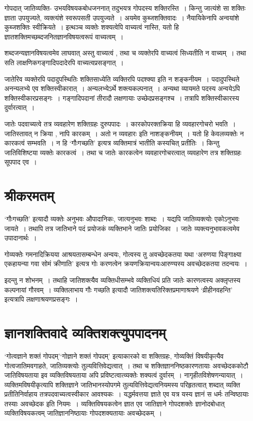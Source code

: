{गोपदात् जातिव्यक्ति- उभयविषयकबोधजननात् तदुभयत्र गोपदस्य शक्तिरस्ति~। किन्तु जात्यंशे सा शक्तिः ज्ञाता उपयुज्यते, व्यक्त्यंशे स्वरूपसती उपयुज्यते~। अयमेव कुब्जशक्तिवादः~। नैयायिकेनापि अन्वयांशे कुब्जशक्तिः स्वीक्रियते~। इत्थञ्च व्यक्तेः शक्यत्वेपि वाच्यत्वं नास्ति, यतो हि ज्ञातशक्तिमच्छब्दजनितज्ञानविषयत्वरूपं वाच्यत्वम्~। 

शब्दजन्यज्ञानविषयत्वमेव लाघवात् अस्तु वाच्यत्वं , तथा च व्यक्तेरपि वाच्यत्वं       सिध्यतीति न वाच्यम्~। तथा सति लाक्षणिकगङ्गादिपदादेरपि वाच्यत्वप्रसङ्गात्~। 

जातेरिव व्यक्तेरपि पदादुपस्थितिः शक्तिसाध्येति व्यक्तिरपि पदश्क्या इति न शङ्कनीयम~। पदादुपस्थिते अनन्यलभ्ये एव शक्तिस्वीकारात्~। अन्यलभ्येऽर्थे शक्त्यकल्पनात्~। अन्यथा व्यायमते पदस्य अन्वयेऽपि शक्तिस्वीकारप्रसङ्गः~। गङ्गादिपदानां तीरादौ लक्षणायाः उच्छेदप्रसङ्गश्च~। तत्रापि शक्तिस्वीकारस्य दुर्वारत्वात्~। 

जातेः पदवाच्यत्वे तत्र व्यवहारेण  शक्तिग्रहः दुरुपपादः~। कारकोपरक्तक्रिया हि व्यवहारगोचरो भवति~। जातिस्तावत् न क्रिया , नापि कारकम्~। अतो न व्यवहारः इति नाशङ्कनीयम्~। यतो हि केवलव्यक्तेः न कारकत्वं सम्भवति~। न हि ‘गौःगच्छति’ इत्यत्र व्यक्तिमात्रं भातीति कस्यचित् प्रतीतिः~। किन्तु जातिविशिष्टया व्यक्तेः कारकत्वं~। तथा च जातेः कारकत्वेन व्यवहारगोचरत्वात् व्यवहारेण तत्र शक्तिग्रहः सूपपाद एव~। 

\section*{श्रीकरमतम्}

‘गौःगच्छति’ इत्यादौ व्यक्तेः अनुभवः औपादानिकः, जात्यनुभवः शाब्दः~। यद्यपि जातिव्यक्त्योः एकोऽनुभवः जायते~। तथापि तत्र जातिभाने पदं प्रयोजकं व्यक्तिभाने जातिः प्रयोजिका~। जातेः व्यक्त्यनुभावकत्वमेव उपादानार्थः~। 
\newpage

गोव्यक्तेः गमनादिक्रियया आश्रयतासम्बन्धेन अन्वयः, गोत्वस्य तु अवच्छेदकतया यथा ‘अरुणया पिङ्गाक्ष्या एकहायन्या गवा सोमं क्रीणाति’ इत्यत्र गोः करणत्वेन क्रयणक्रियान्वयःआरुण्यस्य अवच्छेदकतया तदन्वयः~। 

इदन्तु न शोभनम्~। तथाहि जातिशक्त्यैव व्यक्तिधीसम्भवे व्यक्तिधियं प्रति जातेः कारणत्वस्य अक्लृप्तस्य कल्पनायां गौरवम्~। व्यक्तिलाभाय गौः गच्छति इत्यादौ जातिशक्त्यतिरिक्तप्रमाणाश्रयणे ‘व्रीहीनवहन्ति’ इत्यत्रापि लक्षणाश्रयणप्रसङ्गः~। 

\section*{ज्ञानशक्तिवादे व्यक्तिशक्त्युपपादनम्}

‘गोत्वज्ञाने शक्तं गोपदम्’‘गोज्ञाने शक्तं गोपदम्’ इत्याकारको वा शक्तिग्रहः, गोव्यक्तिं विषयीकृत्यैव गोत्वजातिमवगाहते, जातिव्यक्त्योः      तुल्यवित्तिवेद्यत्वात्~। तथा च शक्तिज्ञाननिष्ठकारणतायाः अवच्छेदककोटौ जातिविषयताया इव व्यक्तिविषयताया अपि प्रविष्टत्वात्\break व्यक्तेः शक्यत्वं दुर्वारम्~। नागृहीतविशेषणन्यायात्~। व्यक्तिमविषयीकृत्यापि शक्तिज्ञाने जाति\-भानस्योपगमे तुल्यवित्तिवेद्यत्वनियमस्य परिहृतत्वात् शब्दात् व्यक्ति प्रतीतिनिर्वाहाय तत्र\break पदवाच्यत्वस्वीकार आवश्यकः~। यद्धर्मवत्तया ज्ञाते एव यत्र यस्य ज्ञानं    स धर्मः तन्वि\-ष्ठायाः तस्याः अवच्छेदक इति नियमः~। व्यक्तिविषयकत्वेन ज्ञात एव जातिज्ञाने गोपदशक्तेः ज्ञानोद\-बोधात् व्यक्तिविषयकत्वम् जातिज्ञाननिष्ठायाः गोपदशक्यतायाः अवच्छेदकम्~। 

}
